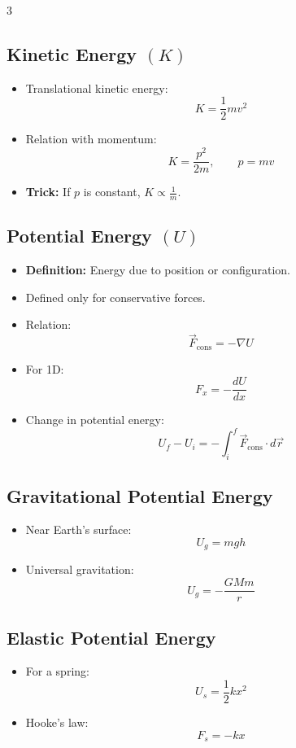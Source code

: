 \documentclass[10pt,a4paper]{article}
\newcommand{\defn}[1]{\textbf{Definition:} #1}
\newcommand{\trick}[1]{\textbf{Trick:} #1}
\begin{document}
\begin{multicols}{3}
\subsection{Kinetic Energy $(K)$}

\begin{itemize}
    \item Translational kinetic energy:
    \[
    K = \frac{1}{2}mv^2
    \]
    \item Relation with momentum:
    \[
    K = \frac{p^2}{2m}, \qquad p = mv
    \]
    \item \trick{If $p$ is constant, $K \propto \frac{1}{m}$.}
\end{itemize}

\subsection{Potential Energy $(U)$}

\begin{itemize}
    \item \defn{Energy due to position or configuration.}
    \item Defined only for conservative forces.
    \item Relation:
    \[
    \vec{F}_{\text{cons}} = -\nabla U
    \]
    \item For 1D:
    \[
    F_x = -\frac{dU}{dx}
    \]
    \item Change in potential energy:
    \[
    U_f - U_i = - \int_i^f \vec{F}_{\text{cons}}\cdot d\vec{r}
    \]
\end{itemize}

\subsection{Gravitational Potential Energy}

\begin{itemize}
    \item Near Earth's surface:
    \[
    U_g = mgh
    \]
    \item Universal gravitation:
    \[
    U_g = -\frac{GMm}{r}
    \]
\end{itemize}

\subsection{Elastic Potential Energy}

\begin{itemize}
    \item For a spring:
    \[
    U_s = \frac{1}{2}kx^2
    \]
    \item Hooke's law:
    \[
    F_s = -kx
    \]
\end{itemize}


\end{multicols}
\end{document}

